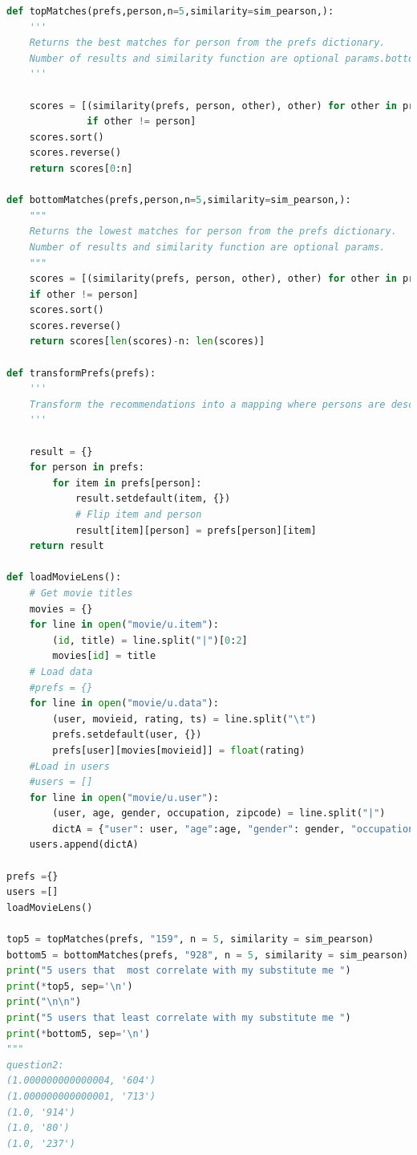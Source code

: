 \documentclass[12pt]{article}
\begin{document}
\begin{lstlisting}[language=Python, caption=two.py , label=2nd:copy]
def topMatches(prefs,person,n=5,similarity=sim_pearson,):
    '''
    Returns the best matches for person from the prefs dictionary. 
    Number of results and similarity function are optional params.bottomMatches
    '''

    scores = [(similarity(prefs, person, other), other) for other in prefs
              if other != person]
    scores.sort()
    scores.reverse()
    return scores[0:n]

def bottomMatches(prefs,person,n=5,similarity=sim_pearson,):
    """
    Returns the lowest matches for person from the prefs dictionary.
    Number of results and similarity function are optional params.
    """
    scores = [(similarity(prefs, person, other), other) for other in prefs 
    if other != person]
    scores.sort()
    scores.reverse()
    return scores[len(scores)-n: len(scores)]

def transformPrefs(prefs):
    '''
    Transform the recommendations into a mapping where persons are described with interest scores for a given title e.g. {title: person} instead of {person: title}
    '''

    result = {}
    for person in prefs:
        for item in prefs[person]:
            result.setdefault(item, {})
            # Flip item and person
            result[item][person] = prefs[person][item]
    return result

def loadMovieLens():
    # Get movie titles
    movies = {}
    for line in open("movie/u.item"):
        (id, title) = line.split("|")[0:2]
        movies[id] = title
    # Load data
    #prefs = {}
    for line in open("movie/u.data"):
        (user, movieid, rating, ts) = line.split("\t")
        prefs.setdefault(user, {})
        prefs[user][movies[movieid]] = float(rating)
    #Load in users
    #users = []
    for line in open("movie/u.user"):
        (user, age, gender, occupation, zipcode) = line.split("|")
        dictA = {"user": user, "age":age, "gender": gender, "occupation" :occupation }
    users.append(dictA)

prefs ={}
users =[]
loadMovieLens()

top5 = topMatches(prefs, "159", n = 5, similarity = sim_pearson)
bottom5 = bottomMatches(prefs, "928", n = 5, similarity = sim_pearson)
print("5 users that  most correlate with my substitute me ")
print(*top5, sep='\n')
print("\n\n")
print("5 users that least correlate with my substitute me ")
print(*bottom5, sep='\n')
"""
question2:
(1.000000000000004, '604')
(1.000000000000001, '713')
(1.0, '914')
(1.0, '80')
(1.0, '237')


\end{lstlisting}
\end{document}
